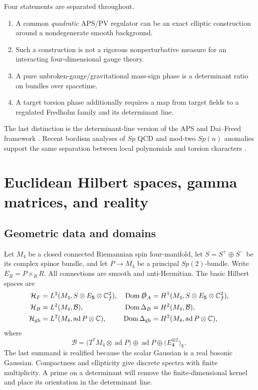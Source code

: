\documentclass[11pt]{article}
\theoremstyle{definition}
\theoremstyle{remark}
\newcommand{\RR}{\mathbb R}
\newcommand{\CC}{\mathbb C}
\newcommand{\cH}{\mathcal H}
\begin{document}
Four statements are separated throughout.
\begin{enumerate}[label=(\roman*)]
\item A common \emph{quadratic} APS/PV regulator can be an exact elliptic
  construction around a nondegenerate smooth background.
\item Such a construction is not a rigorous nonperturbative measure for an
  interacting four-dimensional gauge theory.
\item A pure unbroken-gauge/gravitational mass-sign phase is a determinant
  ratio on bundles over spacetime.
\item A target torsion phase additionally requires a map from target fields
  to a regulated Fredholm family and its determinant line.
\end{enumerate}
The last distinction is the determinant-line version of the APS and
Dai--Freed framework \cite{AtiyahPatodiSinger1975,BismutFreed1986,DaiFreed1994}.
Recent bordism analyses of \(Sp\) QCD and mod-two \(Sp(n)\) anomalies support
the same separation between local polynomials and torsion characters
\cite{Saito2024,SaitoTachikawa2025}.

\section{Euclidean Hilbert spaces, gamma matrices, and reality}

\subsection{Geometric data and domains}

Let \(M_4\) be a closed connected Riemannian spin four-manifold, let
\(S=S^+\oplus S^-\) be its complex spinor bundle, and let
\(P\to M_4\) be a principal \(Sp(2)\)-bundle.  Write \(E_R=P\times_R R\).
All connections are smooth and anti-Hermitian.  The basic Hilbert spaces are
\begin{align}
 \cH_F&=L^2(M_4,S\otimes E_{\bm5}\otimes\CC^2_f),
 &\operatorname{Dom}\slashed D_A&=H^1(M_4,S\otimes E_{\bm5}\otimes\CC^2_f),
 \label{eq:fermion-domain}\\
 \cH_B&=L^2(M_4,\mathcal B),
 &\operatorname{Dom}\Delta_B&=H^2(M_4,\mathcal B),
 \label{eq:boson-domain}\\
 \cH_{\rm gh}&=L^2(M_4,\operatorname{ad}P\otimes\CC),
 &\operatorname{Dom}\Delta_{\rm gh}&=H^2(M_4,\operatorname{ad}P\otimes\CC),
 \label{eq:ghost-domain}
\end{align}
where
\begin{equation}
 \mathcal B=
 \bigl(T^*M_4\otimes\operatorname{ad}P\bigr)
 \oplus\operatorname{ad}P
 \oplus\bigl(E_{\bm4}^{\oplus2}\bigr)_{\RR}.
 \label{eq:boson-bundle}
\end{equation}
The last summand is realified because the scalar Gaussian is a real bosonic
Gaussian.  Compactness and ellipticity give discrete spectra with finite
multiplicity.  A prime on a determinant will remove the finite-dimensional
kernel and place its orientation in the determinant line.
\end{document}
